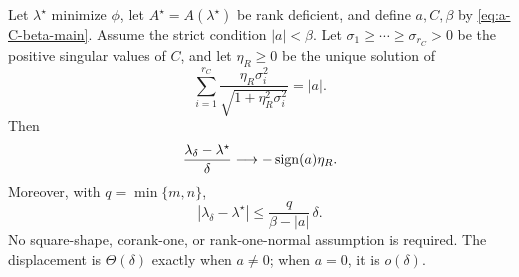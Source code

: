 \begin{theorem}
\label{thm:rate-strict-general}
Let \(\lambda^\star\) minimize \(\phi\), let
\(A^\star=A(\lambda^\star)\) be rank deficient, and define \(a,C,\beta\)
by \eqref{eq:a-C-beta-main}.  Assume the strict condition
\(|a|<\beta\).  Let
\(\sigma_1\ge\cdots\ge\sigma_{r_C}>0\) be the positive singular values
of \(C\), and let \(\eta_R\ge0\) be the unique solution of
\begin{equation}
 \sum_{i=1}^{r_C}
 \frac{\eta_R\sigma_i^2}{\sqrt{1+\eta_R^2\sigma_i^2}}=|a|.
 \label{eq:eta-strict-rate-main}
\end{equation}
Then
\begin{equation}
 \frac{\lambda_\delta-\lambda^\star}{\delta}
 \longrightarrow-\operatorname{sign}(a)\eta_R.
 \label{eq:strict-general-rate-main}
\end{equation}
Moreover, with \(q=\min\{m,n\}\),
\begin{equation}
 |\lambda_\delta-\lambda^\star|
 \le \frac{q}{\beta-|a|}\,\delta.
 \label{eq:strict-general-bound-main}
\end{equation}
No square-shape, corank-one, or rank-one-normal assumption is required.
The displacement is \(\Theta(\delta)\) exactly when \(a\ne0\); when
\(a=0\), it is \(o(\delta)\).
\end{theorem}

